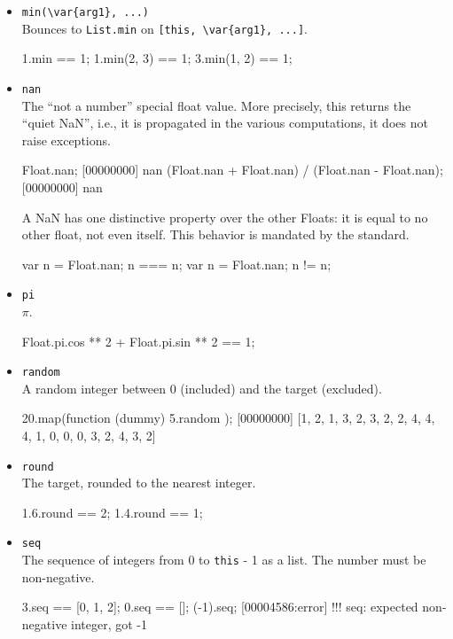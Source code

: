 \begin{itemize}
\item \lstinline|min(\var{arg1}, ...)|\\
  Bounces to \lstinline|List.min| on \lstinline|[this, \var{arg1}, ...]|.
\begin{urbiassert}
1.min == 1;
1.min(2, 3) == 1;
3.min(1, 2) == 1;
\end{urbiassert}

\item \lstinline|nan|\\
  The ``not a number'' special float value.  More precisely, this
  returns the ``quiet NaN'', i.e., it is propagated in the various
  computations, it does not raise exceptions.
\begin{urbiscript}
Float.nan;
[00000000] nan
(Float.nan + Float.nan) / (Float.nan - Float.nan);
[00000000] nan
\end{urbiscript}

A {NaN} has one distinctive property over the other Floats: it is
equal to no other float, not even itself.  This behavior is mandated
by the  standard.
\begin{urbiassert}
{ var n = Float.nan; n === n};
{ var n = Float.nan; n  != n};
\end{urbiassert}

\item \lstinline|pi|\\
  $\pi$.
\begin{urbiassert}
Float.pi.cos ** 2 + Float.pi.sin ** 2 == 1;
\end{urbiassert}

\item \lstinline|random|\\
  A random integer between 0 (included) and the target (excluded).
\begin{urbiscript}
20.map(function (dummy) { 5.random });
[00000000] [1, 2, 1, 3, 2, 3, 2, 2, 4, 4, 4, 1, 0, 0, 0, 3, 2, 4, 3, 2]
\end{urbiscript}

\item \lstinline|round|\\
  The target, rounded to the nearest integer.
\begin{urbiassert}
1.6.round == 2;
1.4.round == 1;
\end{urbiassert}

\item \lstinline|seq|\\
  The sequence of integers from 0 to \lstinline|this| - 1 as a list.
  The number must be non-negative.
\begin{urbiassert}
3.seq == [0, 1, 2];
0.seq == [];
(-1).seq;
[00004586:error] !!! seq: expected non-negative integer, got -1
\end{urbiassert}


\end{itemize}
